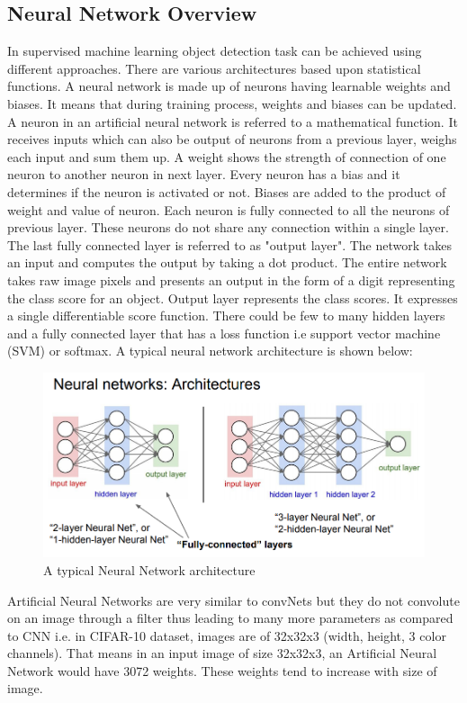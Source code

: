 \documentclass[11pt]{article}
\begin{document}
\subsection{Neural Network Overview}
In supervised machine learning object detection task can be achieved using different approaches. There are various architectures based upon statistical functions. A neural network is made up of neurons having learnable weights and biases. It means that during training process, weights and biases can be updated. A neuron in an artificial neural network is referred to a mathematical function. It receives inputs which can also be output of neurons from a previous layer, weighs each input and sum them up. A weight shows the strength of connection of one neuron to another neuron in next layer. Every neuron has a bias and it determines if the neuron is activated or not. Biases are added to the product of weight and value of neuron. Each neuron is fully connected to all the neurons of previous layer. These neurons do not share any connection within a single layer. The last fully connected layer is referred to as "output layer". The network takes an input and computes the output by taking a dot product. The entire network takes raw image pixels and presents an output in the form of a digit representing the class score for an object. Output layer represents the class scores. It expresses a single differentiable score function. There could be few to many hidden layers and a fully connected layer that has a loss function i.e support vector machine (SVM) or softmax. A typical neural network architecture is shown below:

\begin{figure}[H]
	\includegraphics[width=\linewidth]{files/NN.jpeg}
	\caption{A typical Neural Network architecture}
	\label{fig: Neural Network architecture}
\end{figure}

Artificial Neural Networks are very similar to convNets but they do not convolute on an image through a filter thus leading to many more parameters as compared to CNN i.e. in CIFAR-10 dataset, images are of 32x32x3 (width, height, 3 color channels). That means in an input image of size 32x32x3, an Artificial Neural Network would have 3072 weights. These weights tend to increase with size of image.
\end{document}
